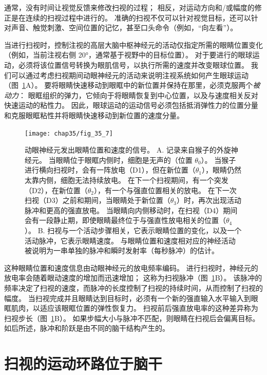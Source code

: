 通常，没有时间让视觉反馈来修改扫视的过程；
相反，对运动方向和/或幅度的修正是在连续的扫视过程中进行的。
准确的扫视不仅可以针对视觉目标，还可以针对声音、触觉刺激、空间位置的记忆，甚至口头命令（例如，“向左看”）。


当进行扫视时，控制注视的高层大脑中枢神经元的活动仅指定所需的眼睛位置变化（例如，当前注视右侧 20°，通常基于视野中的目标位置）。
对于要进行的眼球运动，必须将该位置信号转换为眼肌信号，以执行所需的速度并改变眼球位置。
我们可以通过考虑扫视期间动眼神经元的活动来说明注视系统如何产生眼球运动（图~\ref{fig:35_7}A）。
要将眼睛快速移动到眼眶中的新位置并保持在那里，必须克服两个\textit{被动力}：
眼眶组织的弹力，它倾向于将眼睛恢复到中心位置，以及与速度相关反对快速运动的粘性力。
因此，眼球运动的运动信号必须包括抵消弹性力的位置分量和克服眼眶粘性并将眼睛快速移动到新位置的速度分量。


\begin{figure}[htbp]
	\centering
	\texttt{[image: chap35/fig\_35\_7]}
	\caption{动眼神经元发出眼睛位置和速度的信号。
		A. 记录来自猴子的外旋神经元。
		当眼睛位于眼眶内侧时，细胞是无声的（位置 $ \theta_0 $）。
		当猴子进行横向扫视时，会有一阵放电（D1），但在新位置（$ \theta_1 $），眼睛仍然太靠内侧，细胞无法持续放电。
		在下一个扫视期间，有一个突发（D2），在新位置（$ \theta_2 $），有一个与强直位置相关的放电。
		在下一次扫视（D3）之前和期间，当眼睛处于新位置（$ \theta_3 $）时，再次出现活动脉冲和更高的强直放电。
		当眼睛向内侧移动时，在扫视（D4）期间会有一段静止期，即使眼睛最终位于与强直性放电相关的位置（$ \theta_4 $）\cite{fuchs1970firing}。
		B. 扫视与一个活动步骤相关，它表示眼睛位置的变化，以及一个活动脉冲，它表示眼睛速度。
		与眼睛位置和速度相对应的神经活动被说明为一串单独的脉冲和瞬时发射率（每秒脉冲）的估计。}
	\label{fig:35_7}
\end{figure}


这种眼睛位置和速度信息由动眼神经元的放电频率编码。
进行扫视时，神经元的放电率会随着眼动速度的增加而迅速增加；
这称为扫视脉冲（图~\ref{fig:35_7}B）。
该脉冲的频率决定了扫视的速度，而脉冲的长度控制了扫视的持续时间，从而控制了扫视的幅度。
当扫视完成并且眼睛达到目标时，必须有一个新的强直输入水平输入到眼眶肌肉，以适应该眼眶位置的弹性恢复力。
扫视前后强直放电率的这种差异称为扫视步长（图~\ref{fig:35_7}B）。
如果步幅大小与脉冲不匹配，则眼睛在扫视后会偏离目标。
如后所述，脉冲和阶跃是由不同的脑干结构产生的。



\section{扫视的运动环路位于脑干}

